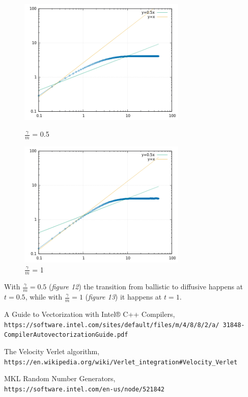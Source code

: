 \documentclass[a4paper,11pt]{article}
\begin{document}
\begin{figure}[!htb]
    \centering
    \begin{minipage}{.5\textwidth}
      \centering
      \includegraphics[width=8cm, height=6cm]{ac3.png}
      \caption{\(\frac{\gamma}{m}\) = 0.5}
    \end{minipage}%
    \begin{minipage}{.5\textwidth}
      \centering
      \includegraphics[width=8cm, height=6cm]{ac4.png}
      \caption{\(\frac{\gamma}{m}\) = 1}
    \end{minipage}
\end{figure}

With \(\frac{\gamma}{m} = 0.5\) (\emph{figure 12}) the transition from ballistic to diffusive happens at \(t = 0.5\), while with \(\frac{\gamma}{m} = 1\) (\emph{figure 13}) it happens at \(t = 1\).

\newpage

\begin{thebibliography}{9}

A Guide to Vectorization with Intel® C++ Compilers,
\\\texttt{https://software.intel.com/sites/default/files/m/4/8/8/2/a/
31848-CompilerAutovectorizationGuide.pdf}

The Velocity Verlet algorithm,
\\\texttt{https://en.wikipedia.org/wiki/Verlet\_integration\#Velocity\_Verlet}

MKL Random Number Generators,
\\\texttt{https://software.intel.com/en-us/node/521842}

\end{thebibliography}
\end{document}
